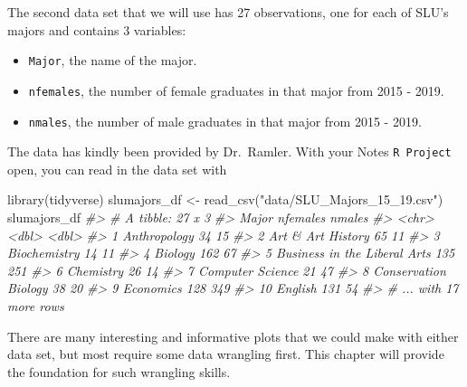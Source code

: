 \documentclass[
]{book}
\newenvironment{Shaded}{\begin{snugshade}}{\end{snugshade}}
\newcommand{\CommentTok}[1]{\textcolor[rgb]{0.56,0.35,0.01}{\textit{#1}}}
\newcommand{\FunctionTok}[1]{\textcolor[rgb]{0.00,0.00,0.00}{#1}}
\newcommand{\NormalTok}[1]{#1}
\newcommand{\OtherTok}[1]{\textcolor[rgb]{0.56,0.35,0.01}{#1}}
\newcommand{\StringTok}[1]{\textcolor[rgb]{0.31,0.60,0.02}{#1}}
\providecommand{\tightlist}{%
  \setlength{\itemsep}{0pt}\setlength{\parskip}{0pt}}
\begin{document}
The second data set that we will use has 27 observations, one for each of SLU's majors and contains 3 variables:

\begin{itemize}
\tightlist
\item
  \texttt{Major}, the name of the major.
\item
  \texttt{nfemales}, the number of female graduates in that major from 2015 - 2019.
\item
  \texttt{nmales}, the number of male graduates in that major from 2015 - 2019.
\end{itemize}

The data has kindly been provided by Dr.~Ramler. With your Notes \texttt{R\ Project} open, you can read in the data set with

\begin{Shaded}
\begin{Highlighting}[]
\FunctionTok{library}\NormalTok{(tidyverse)}
\NormalTok{slumajors\_df }\OtherTok{\textless{}{-}} \FunctionTok{read\_csv}\NormalTok{(}\StringTok{"data/SLU\_Majors\_15\_19.csv"}\NormalTok{)}
\NormalTok{slumajors\_df}
\CommentTok{\#\textgreater{} \# A tibble: 27 x 3}
\CommentTok{\#\textgreater{}    Major                        nfemales nmales}
\CommentTok{\#\textgreater{}    \textless{}chr\textgreater{}                           \textless{}dbl\textgreater{}  \textless{}dbl\textgreater{}}
\CommentTok{\#\textgreater{}  1 Anthropology                       34     15}
\CommentTok{\#\textgreater{}  2 Art \& Art History                  65     11}
\CommentTok{\#\textgreater{}  3 Biochemistry                       14     11}
\CommentTok{\#\textgreater{}  4 Biology                           162     67}
\CommentTok{\#\textgreater{}  5 Business in the Liberal Arts      135    251}
\CommentTok{\#\textgreater{}  6 Chemistry                          26     14}
\CommentTok{\#\textgreater{}  7 Computer Science                   21     47}
\CommentTok{\#\textgreater{}  8 Conservation Biology               38     20}
\CommentTok{\#\textgreater{}  9 Economics                         128    349}
\CommentTok{\#\textgreater{} 10 English                           131     54}
\CommentTok{\#\textgreater{} \# ... with 17 more rows}
\end{Highlighting}
\end{Shaded}

There are many interesting and informative plots that we could make with either data set, but most require some data wrangling first. This chapter will provide the foundation for such wrangling skills.
\end{document}
